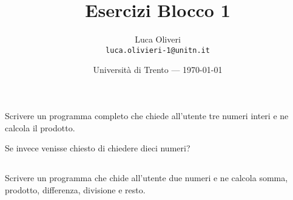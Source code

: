 \documentclass{article}
\title{Esercizi Blocco 1} %
\author{Luca Oliveri\\ \texttt{luca.olivieri-1@unitn.it}} %
\date{Università di Trento --- \today} %
\begin{document}
\maketitle %






\setcounter{section}{1}


\subsection{} 
Scrivere un programma completo che chiede all'utente tre numeri interi e ne calcola il prodotto. 

\begin{warn}[Occhio:]Se invece venisse chiesto di chiedere dieci numeri?
\end{warn}


\subsection{}
Scrivere un programma che chide all'utente due numeri e ne calcola somma, prodotto, differenza, divisione e resto.
\end{document}
